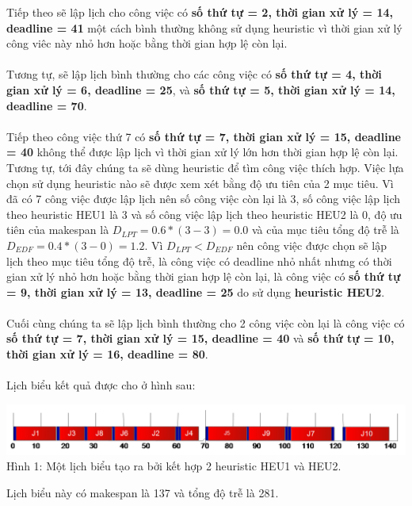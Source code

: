 \documentclass[a4paper,12pt]{article}
\begin{document}
Tiếp theo sẽ lập lịch cho công việc có \textbf{số thứ tự = 2, thời gian xử lý = 14, deadline = 41} một cách bình thường không sử dụng heuristic vì thời gian xử lý công viêc này nhỏ hơn hoặc bằng thời gian hợp lệ còn lại.\\\\
Tương tự, sẽ lập lịch bình thường cho các công việc có \textbf{số thứ tự = 4, thời gian xử lý = 6, deadline = 25}, và \textbf{số thứ tự = 5, thời gian xử lý = 14, deadline = 70}.\\\\
Tiếp theo công việc thứ 7 có \textbf{số thứ tự = 7, thời gian xử lý = 15, deadline = 40} không thể được lập lịch vì thời gian xử lý lớn hơn thời gian hợp lệ còn lại. Tương tự, tới đây chúng ta sẽ dùng heuristic để tìm công việc thích hợp. Việc lựa chọn sử dụng heuristic nào sẽ được xem xét bằng độ ưu tiên của 2 mục tiêu. Vì đã có 7 công việc được lập lịch nên số công việc còn lại là 3, số công việc lập lịch theo heuristic HEU1 là 3 và số công việc lập lịch theo heuristic HEU2 là 0, độ ưu tiên của makespan là $D_{LPT} = 0.6*(3 - 3) = 0.0$ và của mục tiêu tổng độ trễ là $D_{EDF} = 0.4*(3 - 0) = 1.2$. Vì $D_{LPT} < D_{EDF}$ nên công việc được chọn sẽ lập lịch theo mục tiêu tổng độ trễ, là công việc có deadline nhỏ nhất nhưng có thời gian xử lý nhỏ hơn hoặc bằng thời gian hợp lệ còn lại, là công việc có \textbf{số thứ tự = 9, thời gian xử lý = 13, deadline = 25} do sử dụng \textbf{heuristic HEU2}.\\\\
Cuối cùng chúng ta sẽ lập lịch bình thường cho 2 công việc còn lại là công việc có \textbf{số thứ tự = 7, thời gian xử lý = 15, deadline = 40} và  \textbf{số thứ tự = 10, thời gian xử lý = 16, deadline = 80}.\\\\
Lịch biểu kết quả được cho ở hình sau:
\begin{center}
\includegraphics[scale=0.5]{Fig_1.png}
\\
Hình 1: Một lịch biểu tạo ra bởi kết hợp 2 heuristic HEU1 và HEU2.
\end{center}
Lịch biểu này có makespan là 137 và tổng độ trễ là 281.
\end{document}
